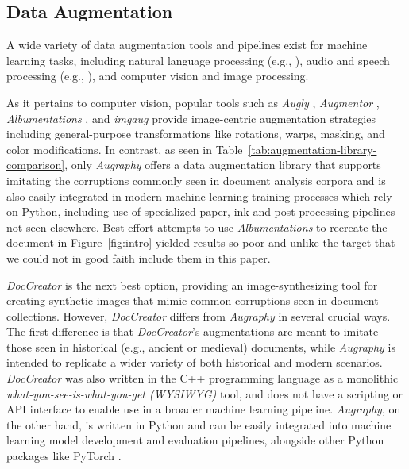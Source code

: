 \documentclass[runningheads]{llncs}
\begin{document}
\subsection{Data Augmentation}
A wide variety of data augmentation tools and pipelines exist for machine learning tasks, including natural language processing (e.g., \cite{feng-etal-2021-survey,fadaee-etal-2017-data,wei-zou-2019-eda}), audio and speech processing (e.g., \cite{ko15_interspeech,audiogmenter,audio-framework}), and computer vision and image processing.

As it pertains to computer vision, popular tools such as \emph{Augly} \cite{Papakipos2022-gq-augly}, \emph{Augmentor} \cite{augmentor}, \emph{Albumentations} \cite{ref_albumentations}, and \emph{imgaug} \cite{ref_imgaug} provide image-centric augmentation strategies including general-purpose transformations like rotations, warps, masking, and color modifications.
In contrast, as seen in Table~\ref{tab:augmentation-library-comparison}, only \emph{Augraphy} offers a data augmentation library that supports imitating the corruptions commonly seen in document analysis corpora and is also easily integrated in modern machine learning training processes which rely on Python, including use of specialized paper, ink and post-processing pipelines not seen elsewhere. Best-effort attempts to use \emph{Albumentations} to recreate the document in Figure~\ref{fig:intro} yielded results so poor and unlike the target that we could not in good faith include them in this paper.

\emph{DocCreator} \cite{ref_DocCreator} is the next best option, providing an image-synthesizing tool for creating synthetic images that mimic common corruptions seen in document collections. However, \emph{DocCreator} differs from \emph{Augraphy} in several crucial ways.
The first difference is that \emph{DocCreator}'s augmentations are meant to imitate those seen in historical (e.g., ancient or medieval) documents, while \emph{Augraphy} is intended to replicate a wider variety of both historical and modern scenarios.
\emph{DocCreator} was also written in the C++ programming language as a monolithic \emph{what-you-see-is-what-you-get (WYSIWYG)} tool, and does not have a scripting or API interface to enable use in a broader machine learning pipeline.
\emph{Augraphy}, on the other hand, is written in Python and can be easily integrated into machine learning model development and evaluation pipelines, alongside other Python packages like PyTorch \cite{ref_pytorch}.
\end{document}
